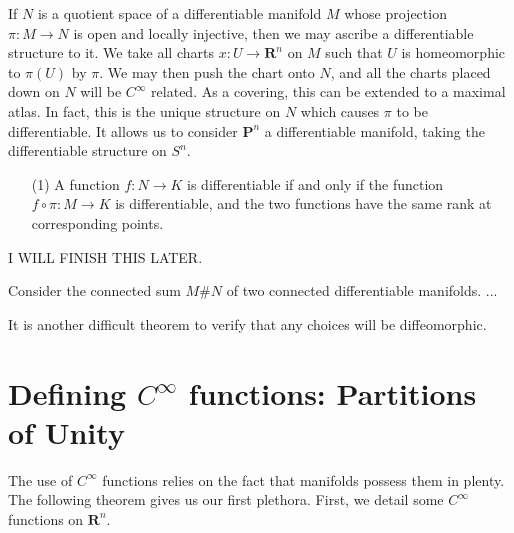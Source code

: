 \begin{example}
    If $N$ is a quotient space of a differentiable manifold $M$ whose projection $\pi:M \to N$ is open and locally injective, then we may ascribe a differentiable structure to it. We take all charts $x:U \to \mathbf{R}^n$ on $M$ such that $U$ is homeomorphic to $\pi(U)$ by $\pi$. We may then push the chart onto $N$, and all the charts placed down on $N$ will be $C^\infty$ related. As a covering, this can be extended to a maximal atlas. In fact, this is the unique structure on $N$ which causes $\pi$ to be differentiable. It allows us to consider $\mathbf{P}^n$ a differentiable manifold, taking the differentiable structure on $S^n$.
    \begin{enumerate}
        \item[(1)] A function $f:N \to K$ is differentiable if and only if the function $f \circ \pi: M \to K$ is differentiable, and the two functions have the same rank at corresponding points.
    \end{enumerate}
\end{example}

\begin{example}
    I WILL FINISH THIS LATER.

    Consider the connected sum $M \# N$ of two connected differentiable manifolds. ...

    It is another difficult theorem to verify that any choices will be diffeomorphic.
\end{example}




\section{Defining $C^\infty$ functions: Partitions of Unity}

The use of $C^\infty$ functions relies on the fact that manifolds possess them in plenty. The following theorem gives us our first plethora. First, we detail some $C^\infty$ functions on $\mathbf{R}^n$.

